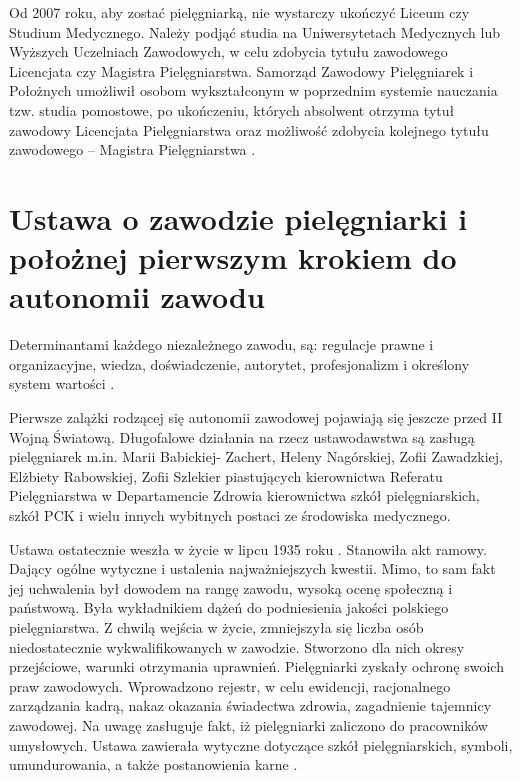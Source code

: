 \documentclass[a4paper,12pt,twoside,openany]{report}
\begin{document}
Od 2007 roku, aby zostać pielęgniarką, nie wystarczy ukończyć Liceum czy Studium Medycznego. Należy podjąć studia na Uniwersytetach Medycznych lub Wyższych Uczelniach Zawodowych, w celu zdobycia tytułu zawodowego Licencjata czy Magistra Pielęgniarstwa. Samorząd Zawodowy Pielęgniarek i Położnych umożliwił osobom wykształconym w poprzednim systemie nauczania tzw. studia pomostowe, po ukończeniu, których absolwent otrzyma tytuł zawodowy Licencjata Pielęgniarstwa oraz możliwość zdobycia kolejnego tytułu zawodowego – Magistra Pielęgniarstwa \cite{model}.

\section{Ustawa o zawodzie pielęgniarki i położnej pierwszym krokiem do autonomii zawodu}
Determinantami każdego niezależnego zawodu, są: regulacje prawne i organizacyjne, wiedza, doświadczenie, autorytet, profesjonalizm i określony system wartości  \cite{deter}.

Pierwsze zalążki rodzącej się autonomii zawodowej pojawiają się jeszcze przed II Wojną Światową. Długofalowe działania na rzecz ustawodawstwa są zasługą pielęgniarek m.in.  Marii Babickiej- Zachert, Heleny Nagórskiej, Zofii Zawadzkiej, Elżbiety Rabowskiej, Zofii Szlekier piastujących kierownictwa Referatu Pielęgniarstwa w Departamencie Zdrowia kierownictwa szkół pielęgniarskich, szkół PCK i wielu innych wybitnych postaci ze środowiska medycznego.

Ustawa ostatecznie weszła w życie w lipcu 1935 roku \cite{usta}. Stanowiła akt ramowy. Dający ogólne wytyczne i ustalenia najważniejszych kwestii. Mimo, to sam fakt jej uchwalenia był dowodem na rangę zawodu, wysoką ocenę społeczną i państwową. Była wykładnikiem dążeń do podniesienia jakości polskiego pielęgniarstwa. Z chwilą wejścia w życie, zmniejszyła się liczba osób niedostatecznie wykwalifikowanych w zawodzie. Stworzono dla nich okresy przejściowe, warunki otrzymania uprawnień. Pielęgniarki zyskały ochronę swoich praw zawodowych. Wprowadzono rejestr, w celu ewidencji, racjonalnego zarządzania kadrą, nakaz okazania świadectwa zdrowia, zagadnienie tajemnicy zawodowej. Na uwagę zasługuje fakt, iż pielęgniarki zaliczono do pracowników umysłowych. Ustawa zawierała wytyczne dotyczące szkół pielęgniarskich, symboli, umundurowania, a także postanowienia karne \cite{1935}.
\end{document}
